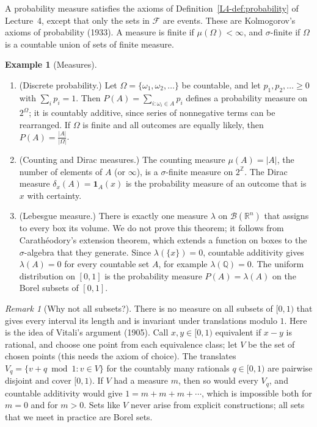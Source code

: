 \documentclass[11pt]{article}
\theoremstyle{definition}
\newtheorem{example}[definition]{Example}
\theoremstyle{plain}
\theoremstyle{remark}
\newtheorem{remark}[definition]{Remark}
\begin{document}
A probability measure satisfies the axioms of Definition~\ref{L4-def:probability} of Lecture~4, except that only the sets in $\mathcal{F}$ are events. These are Kolmogorov's axioms of probability (1933). A measure is finite if $\mu(\Omega) < \infty$, and $\sigma$-finite if $\Omega$ is a countable union of sets of finite measure.

\begin{example}[Measures]\label{ex:measures}
    \begin{enumerate}
        \item (Discrete probability.) Let $\Omega = \{\omega_1, \omega_2, \ldots\}$ be countable, and let $p_1, p_2, \ldots \geq 0$ with $\sum_i p_i = 1$. Then $P(A) = \sum_{i : \omega_i \in A} p_i$ defines a probability measure on $2^\Omega$; it is countably additive, since series of nonnegative terms can be rearranged. If $\Omega$ is finite and all outcomes are equally likely, then $P(A) = \frac{|A|}{|\Omega|}$.
        \item (Counting and Dirac measures.) The counting measure $\mu(A) = |A|$, the number of elements of $A$ (or $\infty$), is a $\sigma$-finite measure on $2^{\mathbb{Z}}$. The Dirac measure $\delta_x(A) = \mathbf{1}_A(x)$ is the probability measure of an outcome that is $x$ with certainty.
        \item (Lebesgue measure.) There is exactly one measure $\lambda$ on $\mathcal{B}(\mathbb{R}^n)$ that assigns to every box its volume. We do not prove this theorem; it follows from Carath\'eodory's extension theorem, which extends a function on boxes to the $\sigma$-algebra that they generate. Since $\lambda(\{x\}) = 0$, countable additivity gives $\lambda(A) = 0$ for every countable set $A$, for example $\lambda(\mathbb{Q}) = 0$. The uniform distribution on $[0, 1]$ is the probability measure $P(A) = \lambda(A)$ on the Borel subsets of $[0, 1]$.
    \end{enumerate}
\end{example}

\begin{remark}[Why not all subsets?]\label{rem:vitali}
    There is no measure on all subsets of $[0, 1)$ that gives every interval its length and is invariant under translations modulo $1$. Here is the idea of Vitali's argument (1905). Call $x, y \in [0, 1)$ equivalent if $x - y$ is rational, and choose one point from each equivalence class; let $V$ be the set of chosen points (this needs the axiom of choice). The translates $V_q = \{v + q \bmod 1 : v \in V\}$ for the countably many rationals $q \in [0, 1)$ are pairwise disjoint and cover $[0, 1)$. If $V$ had a measure $m$, then so would every $V_q$, and countable additivity would give $1 = m + m + m + \cdots$, which is impossible both for $m = 0$ and for $m > 0$. Sets like $V$ never arise from explicit constructions; all sets that we meet in practice are Borel sets.
\end{remark}
\end{document}
